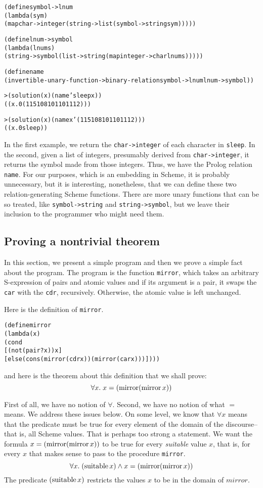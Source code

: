 \begin{alltt}
(define symbol->lnum
  (lambda (sym)
    (map char->integer (string->list (symbol->string sym)))))

(define lnum->symbol
  (lambda (lnums)
    (string->symbol (list->string (map integer->char lnums)))))

(define name
  (invertible-unary-function->binary-relation symbol->lnum lnum->symbol))
\end{alltt}
\begin{alltt}
> (solution (x) (name 'sleep x))
((x.0 (115 108 101 101 112)))

> (solution (x) (name x '(115 108 101 101 112)))
((x.0 sleep))
\end{alltt}

In the first example, we return the \texttt{char->integer} of each
character in \texttt{sleep}.  In the second, given a list of integers,
presumably derived from \texttt{char->integer}, it returns the symbol
made from those integers.  Thus, we have the Prolog relation
\texttt{name}.  For our purposes, which is an embedding in Scheme, it
is probably unnecessary, but it is interesting, nonetheless, that we
can define these two relation-generating Scheme functions.  There are
more unary functions that can be so treated, like
\texttt{symbol->string} and \texttt{string->symbol}, but we leave
their inclusion to the programmer who might need them.

\subsection{Proving a nontrivial theorem}
In this section, we present a simple program and then we prove a
simple fact about the program.  The program is the function
\texttt{mirror}, which takes an arbitrary S-expression of pairs
and atomic values and if its argument is a pair, it swaps the
\texttt{car} with the \texttt{cdr}, recursively.  Otherwise, the
atomic value is left unchanged.

Here is the definition of \texttt{mirror}.
\begin{alltt}
(define mirror
  (lambda (x)
    (cond
      [(not (pair? x)) x]
      [else (cons (mirror (cdr x)) (mirror (car x)))])))
\end{alltt}
and here is the theorem about this definition that we shall prove:
$$\forall x. \; x = (\mathop{\mathrm{mirror}} (\mathop{\mathrm{mirror}} x))$$

First of all, we have no notion of $\forall$.  Second, we have no
notion of what $=$ means.  We address these issues below.  On some
level, we know that $\forall x$ means that the predicate
must be true for every element of the domain of
the discourse--that is, all Scheme values. That is perhaps too
strong a statement. We want the formula $x = (\mathop{\mathrm{mirror}} (\mathop{\mathrm{mirror}} x))$ to
be true for every \emph{suitable} value $x$, that is, for every $x$ that
makes sense to pass to the procedure \texttt{mirror}.  $$\forall
x. \; (\mathop{\mathrm{suitable}} x) \wedge x = (\mathop{\mathrm{mirror}} (\mathop{\mathrm{mirror}} x))$$
The predicate $(\mathop{\mathrm{suitable}} x)$ restricts the values $x$ to be in the domain of
$mirror$.


